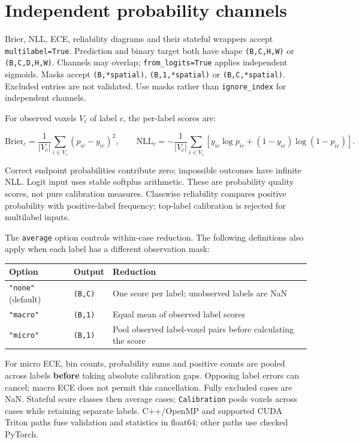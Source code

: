 \section{Independent probability channels}\label{metrics:independent-probability-channels}

Brier, NLL, ECE, reliability diagrams and their stateful wrappers accept \texttt{multilabel=True}.
Prediction and binary target both have shape \texttt{(B,C,H,W)} or
\texttt{(B,C,D,H,W)}. Channels may overlap; \texttt{from\_logits=True} applies independent sigmoids.
Masks accept \texttt{(B,*spatial)}, \texttt{(B,1,*spatial)} or \texttt{(B,C,*spatial)}. Excluded entries are not
validated. Use masks rather than \texttt{ignore\_index} for independent channels.

For observed voxels \(V_c\) of label \(c\), the per-label scores are:

\[
\mathrm{Brier}_c=\frac{1}{|V_c|}\sum_{i\in V_c}(p_{ic}-y_{ic})^2,\qquad
\mathrm{NLL}_c=-\frac{1}{|V_c|}\sum_{i\in V_c}
\left[y_{ic}\log p_{ic}+(1-y_{ic})\log(1-p_{ic})\right].
\]

Correct endpoint probabilities contribute zero; impossible outcomes have infinite NLL.
Logit input uses stable softplus arithmetic. These are probability quality scores, not
pure calibration measures. Classwise reliability compares positive probability with
positive-label frequency; top-label calibration is rejected for multilabel inputs.

The \texttt{average} option controls within-case reduction. The following definitions also apply
when each label has a different observation mask:

{\small{} %
\begin{longtable}[]{@{}lll@{}}
\toprule\noalign{}
Option & Output & Reduction \\
\midrule\noalign{}
\endhead
\bottomrule\noalign{}
\endlastfoot
\texttt{"none"} (default) & \texttt{(B,C)} & One score per label; unobserved labels are NaN \\
\texttt{"macro"} & \texttt{(B,1)} & Equal mean of observed label scores \\
\texttt{"micro"} & \texttt{(B,1)} & Pool observed label-voxel pairs before calculating the score \\
\end{longtable}
}

For micro ECE, bin counts, probability sums and positive counts are pooled across labels
\textbf{before} taking absolute calibration gaps. Opposing label errors can cancel; macro ECE
does not permit this cancellation. Fully excluded cases are NaN. Stateful score classes
then average cases; \texttt{Calibration} pools voxels across cases while retaining separate labels.
C++/OpenMP and supported CUDA Triton paths fuse validation and statistics in float64;
other paths use checked PyTorch.


